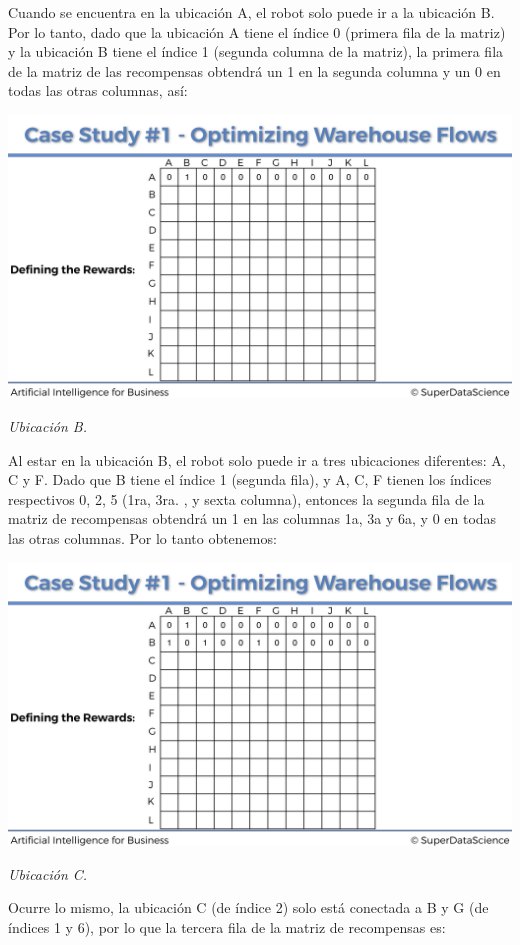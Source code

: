 \documentclass[]{book}
\begin{document}
Cuando se encuentra en la ubicación A, el robot solo puede ir a la ubicación B. Por lo tanto, dado que la ubicación A tiene el índice 0 (primera fila de la matriz) y la ubicación B tiene el índice 1 (segunda columna de la matriz), la primera fila de la matriz de las recompensas obtendrá un 1 en la segunda columna y un 0 en todas las otras columnas, así:

\includegraphics{Images/Rewards_Matrix_1.png}

\emph{Ubicación B.}

Al estar en la ubicación B, el robot solo puede ir a tres ubicaciones diferentes: A, C y F. Dado que B tiene el índice 1 (segunda fila), y A, C, F tienen los índices respectivos 0, 2, 5 (1ra, 3ra. , y sexta columna), entonces la segunda fila de la matriz de recompensas obtendrá un 1 en las columnas 1a, 3a y 6a, y 0 en todas las otras columnas. Por lo tanto obtenemos:

\includegraphics{Images/Rewards_Matrix_2.png}

\emph{Ubicación C.}

Ocurre lo mismo, la ubicación C (de índice 2) solo está conectada a B y G (de índices 1 y 6), por lo que la tercera fila de la matriz de recompensas es:
\end{document}
